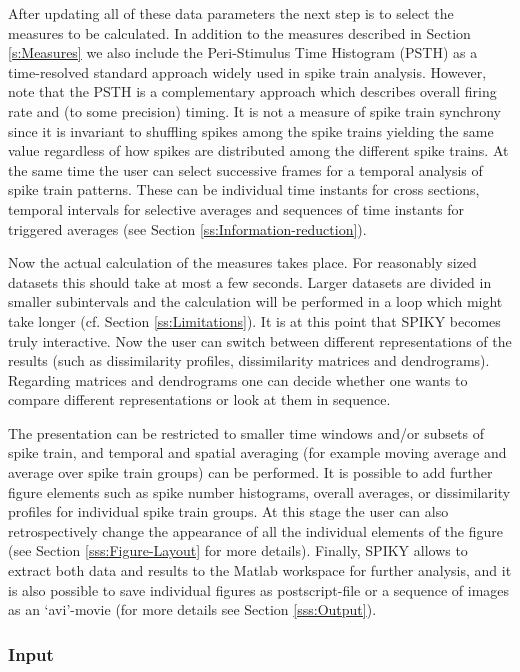 \documentclass[10pt,twocolumn]{elsart5p}
\begin{document}
After updating all of these data parameters the next step is to select the measures to be calculated. In addition to the measures described in Section \ref{s:Measures} we also include the Peri-Stimulus Time Histogram (PSTH) as a time-resolved standard approach widely used in spike train analysis. However, note that the PSTH is a complementary approach which describes overall firing rate and (to some precision) timing. It is not a measure of spike train synchrony \citep{Kreuz11} since it is invariant to shuffling spikes among the spike trains yielding the same value regardless of how spikes are distributed among the different spike trains. At the same time the user can select successive frames for a temporal analysis of spike train patterns. These can be individual time instants for cross sections, temporal intervals for selective averages and sequences of time instants for triggered averages (see Section \ref{ss:Information-reduction}).

Now the actual calculation of the measures takes place. For reasonably sized datasets this should take at most a few seconds. Larger datasets are divided in smaller subintervals and the calculation will be performed in a loop which might take longer (cf. Section \ref{ss:Limitations}). It is at this point that SPIKY becomes truly interactive. Now the user can switch between different representations of the results (such as dissimilarity profiles, dissimilarity matrices and dendrograms). Regarding matrices and dendrograms one can decide whether one wants to compare different representations or look at them in sequence.

The presentation can be restricted to smaller time windows and/or subsets of spike train, and temporal and spatial averaging (for example moving average and average over spike train groups) can be performed. It is possible to add further figure elements such as spike number histograms, overall averages, or dissimilarity profiles for individual spike train groups. At this stage the user can also retrospectively change the appearance of all the individual elements of the figure (see Section \ref{sss:Figure-Layout} for more details). Finally, SPIKY allows to extract both data and results to the Matlab workspace for further analysis, and it is also possible to save individual figures as postscript-file or a sequence of images as an `avi'-movie (for more details see Section \ref{sss:Output}).


\subsubsection{\label{sss:Input} Input}
\end{document}
